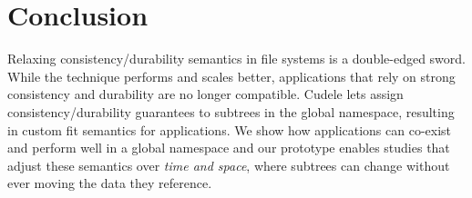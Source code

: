 %
%
%
%
%
%
%

\section{Conclusion}

Relaxing consistency/durability semantics in file systems is a double-edged
sword. While the technique performs and scales better, applications that rely
on strong consistency and durability are no longer compatible.  Cudele lets
 assign consistency/durability
guarantees to subtrees in the global namespace, resulting in 
custom fit semantics for applications. We show how applications can co-exist and
perform well in a global namespace and our prototype enables studies that
adjust these semantics over {\it time and space}, where subtrees can change
without ever moving the data they reference.


